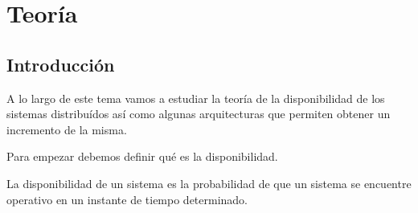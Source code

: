 \section{Teoría}
\subsection{Introducción}
A lo largo de este tema vamos a estudiar la teoría de la disponibilidad de los sistemas distribuídos así como algunas arquitecturas que permiten obtener un incremento de la misma.

Para empezar debemos definir qué es la disponibilidad.

\begin{defn}[Disponibilidad]
La disponibilidad de un sistema es la probabilidad de que un sistema se encuentre operativo en un instante de tiempo determinado.
\end{defn}

